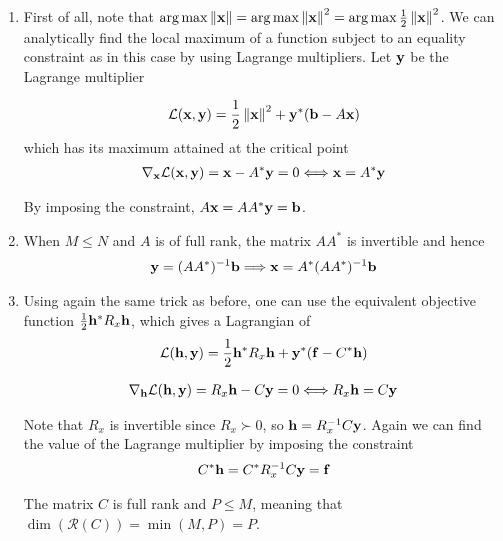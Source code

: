 \documentclass{article}
\begin{document}
    
    \begin{enumerate}[label=(\roman*)]
        \item First of all, note that $\operatorname*{arg\,max} \left\lVert\mathbf{x}\right\rVert=\operatorname*{arg\,max} \left\lVert\mathbf{x}\right\rVert^2 = \operatorname*{arg\,max} \frac{1}{2}\left\lVert\mathbf{x}\right\rVert^2$. We can analytically find the local maximum of a function subject to an equality constraint as in this case by using Lagrange multipliers. Let $\mathbf{y}$ be the Lagrange multiplier
        
        \begin{align}
            \mathcal{L} (\mathbf{x}, \mathbf{y}) = \frac{1}{2}\left\lVert\mathbf{x}\right\rVert^2 + \mathbf{y}^* (\mathbf{b} - A \mathbf{x})
        \end{align}
        which has its maximum attained at the critical point
        \begin{align}
            \nabla_{\mathbf{x}} \mathcal{L}(\mathbf{x}, \mathbf{y}) = \mathbf{x} - A^* \mathbf{y} = 0 \Longleftrightarrow \mathbf{x} = A^* \mathbf{y}
        \end{align}
        
        By imposing the constraint, $A\mathbf{x}= A A^* \mathbf{y}= \mathbf{b}$.
        \item When $M \leq N$ and $A$ is of full rank, the matrix $A A^*$ is invertible and hence
        \begin{align}
            \mathbf{y} = (A A^*)^{-1} \mathbf{b} \Longrightarrow \mathbf{x} = A^* (A A^*)^{-1} \mathbf{b}
        \end{align}
        \item Using again the same trick as before, one can use the equivalent objective function $\frac{1}{2}\mathbf{h}^* R_x \mathbf{h}$, which gives a Lagrangian of
        \begin{align}
             \mathcal{L} (\mathbf{h}, \mathbf{y}) = \frac{1}{2}\mathbf{h}^* R_x \mathbf{h} + \mathbf{y}^* (\mathbf{f} - C^* \mathbf{h})
        \end{align}
        
        \begin{align}
            \nabla_{\mathbf{h}} \mathcal{L}(\mathbf{h}, \mathbf{y}) = R_x \mathbf{h} - C \mathbf{y} = 0 \Longleftrightarrow R_x \mathbf{h} = C \mathbf{y}
        \end{align}
        
        Note that $R_x$ is invertible since $R_x \succ 0$, so $\mathbf{h} = R_x^{-1} C \mathbf{y}$. Again we can find the value of the Lagrange multiplier by imposing the constraint
        \begin{align}
            C^* \mathbf{h} = C^* R_x^{-1} C \mathbf{y} = \mathbf{f}
        \end{align}
        
        \begin{assumption}
            The matrix $C$ is full rank and $P\leq M$, meaning that $\dim (\mathcal{R}(C)) = \min(M,P)= P$.
            \label{ass:1}
        \end{assumption}
        

\end{enumerate}
\end{document}
